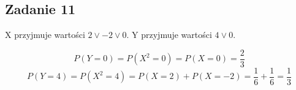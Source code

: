 \subsection{Zadanie 11}

X  przyjmuje  wartości  $2 \lor -2 \lor  0$. Y  przyjmuje wartości $4 \lor 0$.

$$
P(Y = 0) = P(X^2 = 0) = P(X = 0) = \frac{2}{3}
$$
$$
P(Y = 4) = P(X^2 = 4) = P (X = 2) + P(X = -2) = \frac{1}{6} + \frac{1}{6} = \frac{1}{3}
$$
